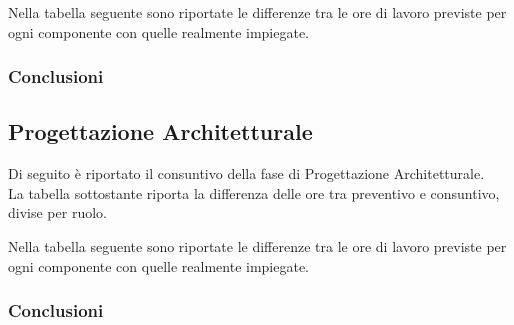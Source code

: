 
Nella tabella seguente sono riportate le differenze tra le ore di lavoro previste per ogni componente con quelle realmente impiegate.


\subsubsection{Conclusioni}

\subsection{Progettazione Architetturale}
Di seguito è riportato il consuntivo della fase di Progettazione Architetturale.\\
La tabella sottostante riporta la differenza delle ore tra preventivo e consuntivo, divise per ruolo.


Nella tabella seguente sono riportate le differenze tra le ore di lavoro previste per ogni componente con quelle realmente impiegate.


\subsubsection{Conclusioni}

